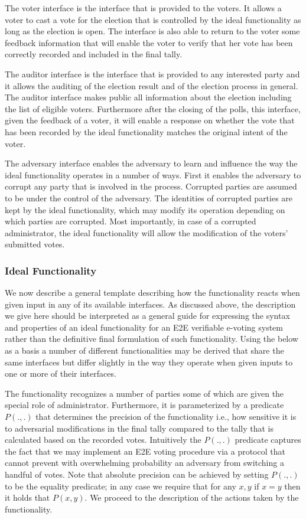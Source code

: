 The voter interface is the interface that is provided to the
voters. It allows a voter to cast a vote for the election that is
controlled by the ideal functionality as long as the election is
open. The interface is also able to return to the voter some feedback
information that will enable the voter to verify that her vote has
been correctly recorded and included in the final tally.

The auditor interface is the interface that is provided to any
interested party and it allows the auditing of the election result and
of the election process in general. The auditor interface makes public
all information about the election including the list of eligible
voters. Furthermore after the closing of the polls, this interface,
given the feedback of a voter, it will enable a response on whether
the vote that has been recorded by the ideal functionality matches the
original intent of the voter.

The adversary interface enables the adversary to learn and influence
the way the ideal functionality operates in a number of ways. First it
enables the adversary to corrupt any party that is involved in the
process. Corrupted parties are assumed to be under the control of the
adversary. The identities of corrupted parties are kept by the ideal
functionality, which may modify its operation depending on which
parties are corrupted. Most importantly, in case of a corrupted
administrator, the ideal functionality will allow the modification of
the voters’ submitted votes.

\subsubsection{Ideal Functionality}

We now describe a general template describing how the functionality
reacts when given input in any of its available interfaces. As
discussed above, the description we give here should be interpreted as
a general guide for expressing the syntax and properties of an ideal
functionality for an E2E verifiable e-voting system rather than the
definitive final formulation of such functionality. Using the below as
a basis a number of different functionalities may be derived that
share the same interfaces but differ slightly in the way they operate
when given inputs to one or more of their interfaces.

The functionality recognizes a number of parties some of which are
given the special role of administrator. Furthermore, it is
parameterized by a predicate $P(.,.)$ that determines the precision of
the functionality i.e., how sensitive it is to adversarial
modifications in the final tally compared to the tally that is
calculated based on the recorded votes. Intuitively the $P(.,.)$
predicate captures the fact that we may implement an E2E voting
procedure via a protocol that cannot prevent with overwhelming
probability an adversary from switching a handful of votes. Note that
absolute precision can be achieved by setting $P(.,.)$ to be the
equality predicate; in any case we require that for any $x,y$ if $x=y$
then it holds that $P(x,y)$. We proceed to the description of the
actions taken by the functionality.

